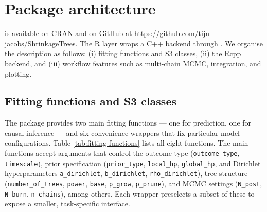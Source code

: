 \section{Package architecture}\label{package-architecture}

 is available on CRAN and on GitHub at \url{https://github.com/tijn-jacobs/ShrinkageTrees}. The R layer wraps a C++ backend through  \citep{eddelbuettel2011rcpp}. We organise the description as follows: (i) fitting functions and S3 classes, (ii) the Rcpp backend, and (iii) workflow features such as multi-chain MCMC,  integration, and plotting.

\subsection{Fitting functions and S3 classes}\label{fitting-functions-and-s3-classes}

The package provides two main fitting functions --- one for prediction, one for causal inference --- and six convenience wrappers that fix particular model configurations. Table \ref{tab:fitting-functions} lists all eight functions. The main functions accept arguments that control the outcome type (\texttt{outcome\_type}, \texttt{timescale}), prior specification (\texttt{prior\_type}, \texttt{local\_hp}, \texttt{global\_hp}, and Dirichlet hyperparameters \texttt{a\_dirichlet}, \texttt{b\_dirichlet}, \texttt{rho\_dirichlet}), tree structure (\texttt{number\_of\_trees}, \texttt{power}, \texttt{base}, \texttt{p\_grow}, \texttt{p\_prune}), and MCMC settings (\texttt{N\_post}, \texttt{N\_burn}, \texttt{n\_chains}), among others. Each wrapper preselects a subset of these to expose a smaller, task-specific interface.

